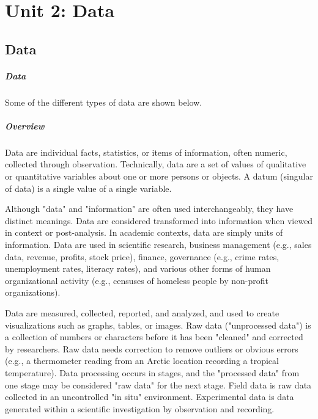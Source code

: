 \chapter{Unit 2: Data}
\label{chap:unit2}

\section{Data}
\label{sec:data}

\paragraph{Data}



Some of the different types of data are shown below.






\paragraph{Overview}



Data are individual facts, statistics, or items of information, often numeric, collected through observation. Technically, data are a set of values of qualitative or quantitative variables about one or more persons or objects. A datum (singular of data) is a single value of a single variable.



Although "data" and "information" are often used interchangeably, they have distinct meanings. Data are considered transformed into information when viewed in context or post-analysis. In academic contexts, data are simply units of information. Data are used in scientific research, business management (e.g., sales data, revenue, profits, stock price), finance, governance (e.g., crime rates, unemployment rates, literacy rates), and various other forms of human organizational activity (e.g., censuses of homeless people by non-profit organizations).



Data are measured, collected, reported, and analyzed, and used to create visualizations such as graphs, tables, or images. Raw data ("unprocessed data") is a collection of numbers or characters before it has been "cleaned" and corrected by researchers. Raw data needs correction to remove outliers or obvious errors (e.g., a thermometer reading from an Arctic location recording a tropical temperature). Data processing occurs in stages, and the "processed data" from one stage may be considered "raw data" for the next stage. Field data is raw data collected in an uncontrolled "in situ" environment. Experimental data is data generated within a scientific investigation by observation and recording.




